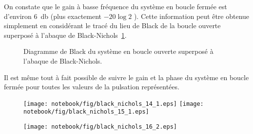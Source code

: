 On constate que le gain à basse fréquence du système en boucle fermée est 
d'environ \SI{6}{\decibel} (plus exactement $-20\log{2}$ ).
Cette information peut être obtenue simplement en considérant 
le tracé du lieu de Black de la boucle ouverte superposé à l'abaque de 
Black-Nichols~\cref{fig-exemple1_BlackNichols}.
\begin{figure}[!h]
    \centering
    \caption{Diagramme de Black du système en boucle ouverte superposé à l'abaque 
    de Black-Nichols.\label{fig-exemple1_BlackNichols}}
\end{figure}
Il est même tout à fait possible de suivre le gain et la phase du système en boucle
fermée pour toutes les valeurs de la pulsation représentées.
    
\begin{figure}[!h]
    \centering
    \texttt{[image: notebook/fig/black\_nichols\_14\_1.eps]}
    \texttt{[image: notebook/fig/black\_nichols\_15\_1.eps]}
\end{figure}

\begin{figure}[!h]
    \centering
    \texttt{[image: notebook/fig/black\_nichols\_16\_2.eps]}
\end{figure}

